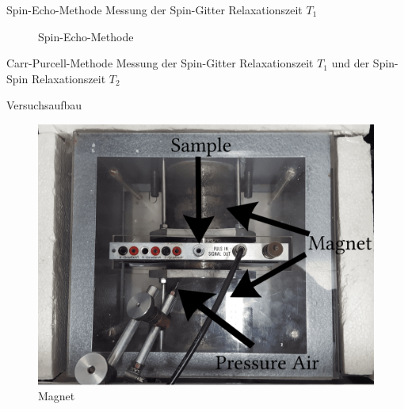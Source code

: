 \begin{frame}{Spin-Echo-Methode}
Messung der Spin-Gitter Relaxationszeit $T_1$
	\begin{figure}
	\centering
	
	\caption{Spin-Echo-Methode}
	\end{figure}
\end{frame}

\begin{frame}{Carr-Purcell-Methode}
Messung der Spin-Gitter Relaxationszeit $T_1$ und der Spin-Spin Relaxationszeit $T_2$
\end{frame}

\begin{frame}{Versuchsaufbau}
	\begin{figure}
	\centering
	\includegraphics[scale=.075]{images//magnet.png}
	\caption{Magnet}
	\end{figure}
\end{frame}

